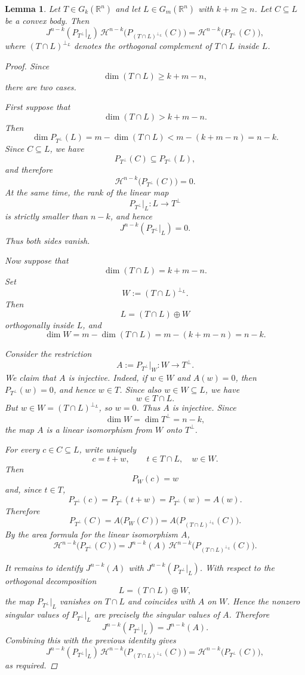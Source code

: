 \documentclass[pdflatex,sn-mathphys-num]{sn-jnl}
\theoremstyle{plain}
\newtheorem{lemma}[theorem]{Lemma}
\theoremstyle{definition}
\begin{document}
\begin{lemma}\label{LP}
Let $T\in G_k(\mathbb R^n)$ and let $L\in G_m(\mathbb R^n)$ with
$k+m\geq n$. Let $C\subseteq L$ be a convex body. Then
\[
J^{n-k}(P_{T^\perp}|_L)\,
\mathcal H^{n-k}\big(P_{(T\cap L)^{\perp_L}}(C)\big)
=
\mathcal H^{n-k}\big(P_{T^\perp}(C)\big),
\]
where $(T\cap L)^{\perp_L}$ denotes the orthogonal complement of $T\cap L$
inside $L$.
\begin{proof}
Since
\[
\dim(T\cap L)\geq k+m-n,
\]
there are two cases.

First suppose that
\[
\dim(T\cap L)>k+m-n.
\]
Then
\[
\dim P_{T^\perp}(L)
=
m-\dim(T\cap L)
<
m-(k+m-n)
=
n-k.
\]
Since $C\subseteq L$, we have
\[
P_{T^\perp}(C)\subseteq P_{T^\perp}(L),
\]
and therefore
\[
\mathcal H^{n-k}\big(P_{T^\perp}(C)\big)=0.
\]
At the same time, the rank of the linear map
\[
P_{T^\perp}|_L\colon L\to T^\perp
\]
is strictly smaller than $n-k$, and hence
\[
J^{n-k}(P_{T^\perp}|_L)=0.
\]
Thus both sides vanish.

Now suppose that
\[
\dim(T\cap L)=k+m-n.
\]
Set
\[
W:=(T\cap L)^{\perp_L}.
\]
Then
\[
L=(T\cap L)\oplus W
\]
orthogonally inside $L$, and
\[
\dim W
=
m-\dim(T\cap L)
=
m-(k+m-n)
=
n-k.
\]

Consider the restriction
\[
A:=P_{T^\perp}|_W\colon W\to T^\perp.
\]
We claim that $A$ is injective. Indeed, if $w\in W$ and $A(w)=0$, then
$P_{T^\perp}(w)=0$, and hence $w\in T$. Since also $w\in W\subseteq L$, we
have
\[
w\in T\cap L.
\]
But $w\in W=(T\cap L)^{\perp_L}$, so $w=0$. Thus $A$ is injective. Since
\[
\dim W=\dim T^\perp=n-k,
\]
the map $A$ is a linear isomorphism from $W$ onto $T^\perp$.

For every $c\in C\subseteq L$, write uniquely
\[
c=t+w,
\qquad
t\in T\cap L,\quad w\in W.
\]
Then
\[
P_W(c)=w
\]
and, since $t\in T$,
\[
P_{T^\perp}(c)
=
P_{T^\perp}(t+w)
=
P_{T^\perp}(w)
=
A(w).
\]
Therefore
\[
P_{T^\perp}(C)
=
A\big(P_W(C)\big)
=
A\big(P_{(T\cap L)^{\perp_L}}(C)\big).
\]
By the area formula for the linear isomorphism $A$,
\[
\mathcal H^{n-k}\big(P_{T^\perp}(C)\big)
=
J^{n-k}(A)\,
\mathcal H^{n-k}\big(P_{(T\cap L)^{\perp_L}}(C)\big).
\]

It remains to identify $J^{n-k}(A)$ with
$J^{n-k}(P_{T^\perp}|_L)$. With respect to the orthogonal decomposition
\[
L=(T\cap L)\oplus W,
\]
the map $P_{T^\perp}|_L$ vanishes on $T\cap L$ and coincides with $A$ on
$W$. Hence the nonzero singular values of $P_{T^\perp}|_L$ are precisely
the singular values of $A$. Therefore
\[
J^{n-k}(P_{T^\perp}|_L)=J^{n-k}(A).
\]
Combining this with the previous identity gives
\[
J^{n-k}(P_{T^\perp}|_L)\,
\mathcal H^{n-k}\big(P_{(T\cap L)^{\perp_L}}(C)\big)
=
\mathcal H^{n-k}\big(P_{T^\perp}(C)\big),
\]
as required.
\end{proof}
\end{lemma}
\end{document}
